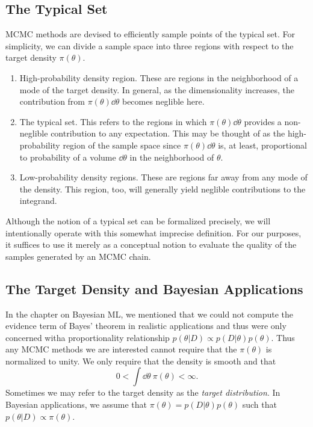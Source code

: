 \subsection{The Typical Set}
MCMC methods are devised to efficiently sample points of the typical set. For simplicity, we can divide a
sample space into three regions with respect to the target density $\pi(\theta)$.
\begin{enumerate}
    \item High-probability density region. These are regions in the neighborhood of a mode of the target density.
    In general, as the dimensionality increases, the contribution from $\pi(\theta) \dd \theta$ becomes neglible here.
    \item The typical set. This refers to the regions in which $\pi(\theta) \dd \theta$ provides a non-neglible contribution
    to any expectation. This may be thought of as the high-probability region of the sample space
    since $\pi(\theta) \dd \theta$ is, at least, proportional to probability of a volume $\dd\theta$ in the neighborhood of $\theta$. 
    \item Low-probability density regions. These are regions far away from any mode of the density. This region, too, will generally
    yield neglible contributions to the integrand.
\end{enumerate}
Although the notion of a typical set can be formalized precisely, we will intentionally 
operate with this somewhat imprecise definition. For our purposes, it suffices to use it merely as
a conceptual notion to evaluate the quality of the samples generated by an MCMC chain. 
\subsection{The Target Density and Bayesian Applications}
In the chapter on Bayesian ML, we mentioned that we could not compute the evidence term of Bayes' theorem in 
realistic applications and thus were only concerned witha proportionality relationship $p(\theta|D)\propto p(D|\theta)p(\theta)$. Thus any MCMC methods we are interested cannot require that the $\pi(\theta)$ is normalized to unity. We only require that the density is smooth and that 
\begin{equation}
  0 < \int \dd\theta \ \pi(\theta) < \infty.
\end{equation} 
Sometimes we may refer to the target density as the \textit{target distribution}.
In Bayesian applications, we assume that $\pi(\theta) = p(D|\theta)p(\theta)$ such that $p(\theta|D) \propto \pi(\theta)$.

